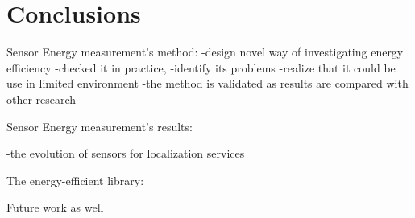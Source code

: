 \section{Conclusions}
\label{s:conc}


Sensor Energy measurement's method:
	-design novel way of investigating energy efficiency
	-checked it in practice, 
		-identify its problems
	-realize that it could be use in limited environment
	-the method is validated as results are compared with other research
	
	
Sensor Energy measurement's results:
	
	-the evolution of sensors for localization services
	
	
The energy-efficient library:






Future work as well